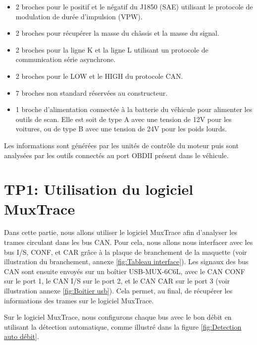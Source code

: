 \documentclass{rapportECC}
\begin{document}
\begin{itemize}
    \item 2 broches pour le positif et le négatif du J1850 (SAE) utilisant le protocole de modulation de durée d’impulsion (VPW).
    \item 2 broches pour récupérer la masse du châssis et la masse du signal.
    \item 2 broches pour la ligne K et la ligne L utilisant un protocole de communication série asynchrone.
    \item 2 broches pour le LOW et le HIGH du protocole CAN.
    \item 7 broches non standard réservées au constructeur.
    \item 1 broche d'alimentation connectée à la batterie du véhicule pour alimenter les outils de scan. Elle est soit de type A avec une tension de 12V pour les voitures, ou de type B avec une tension de 24V pour les poids lourds.
\end{itemize}

Les informations sont générées par les unités de contrôle du moteur puis sont analysées par les outils connectés au port OBDII présent dans le véhicule.


\section{TP1: Utilisation du logiciel MuxTrace}

Dans cette partie, nous allons utiliser le logiciel MuxTrace afin d'analyser les trames circulant dans les bus CAN. Pour cela, nous allons nous interfacer avec les bus I/S, CONF, et CAR grâce à la plaque de branchement de la maquette (voir illustration du branchement, annexe \ref{fig:Tableau interface}). Les signaux des bus CAN sont ensuite envoyés sur un boîtier USB-MUX-6C6L, avec le CAN CONF sur le port 1, le CAN I/S sur le port 2, et le CAN CAR sur le port 3 (voir illustration annexe \ref{fig:Boitier usb}). Cela permet, au final, de récupérer les informations des trames sur le logiciel MuxTrace.

Sur le logiciel MuxTrace, nous configurons chaque bus avec le bon débit en utilisant la détection automatique, comme illustré dans la figure \ref{fig:Detection auto débit}.
\end{document}
